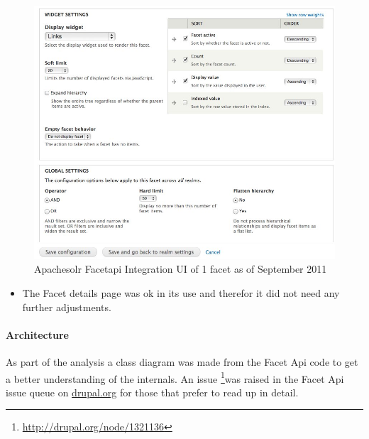 \begin{figure}[H]
     \includegraphics[width=\textwidth]{images/facetapi_ui_facet_september_2011.jpg}
     \caption{Apachesolr Facetapi Integration UI of 1 facet as of September 2011}
\end{figure}
\begin{itemize}
\item The Facet details page was ok in its use and therefor it did not need any further adjustments.
\end{itemize}

\paragraph{Architecture}
As part of the analysis a class diagram was made from the Facet Api code to get a better understanding of the internals. An issue \footnote{\url{http://drupal.org/node/1321136}}was raised in the Facet Api issue queue on \url{drupal.org} for those that prefer to read up in detail.

